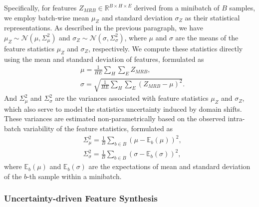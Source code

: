 \documentclass[lettersize,journal]{IEEEtran}
\begin{document}
Specifically, for features $ Z_{MRB} \in \mathbb{R}^{B \times H \times E} $ derived from a minibatch of $ B $ samples, we employ batch-wise mean $ \mu_{Z} $ and standard deviation $ \sigma_{Z} $ as their statistical representations.
As described in the previous paragraph, we have $ \mu_{Z} \sim \mathcal{N}(\mu, \Sigma_{\mu}^{2}) $ and $ \sigma_{Z} \sim \mathcal{N}(\sigma, \Sigma_{\sigma}^{2}) $, where $ \mu $ and $ \sigma $ are the means of the feature statistics $ \mu_{Z} $ and $ \sigma_{Z} $, respectively.
We compute these statistics directly using the mean and standard deviation of features, formulated as
\begin{align}
    & \mu=\frac{1}{HE}\sum_{H}\sum_{E}Z_{MRB}, \\
    & \sigma = \sqrt{\frac{1}{HE}\sum_{H}\sum_{E}(Z_{MRB} - \mu)^{2}}.
\end{align}
And $ \Sigma_{\mu}^{2} $ and $ \Sigma_{\sigma}^{2} $ are the variances associated with feature statistics $\mu_{Z}$ and $\sigma_{Z}$, which also serve to model the statistics uncertainty induced by domain shifts.
These variances are estimated non-parametrically based on the observed intra-batch variability of the feature statistics, formulated as
\begin{align}
    & \Sigma_{\mu}^{2}=\frac{1}{B}\sum_{b\in B}(\mu-\mathbb{E}_{b}(\mu))^{2}, \\
    & \Sigma_{\sigma}^{2} = \frac{1}{B}\sum_{b\in B}(\sigma-\mathbb{E}_{b}(\sigma))^{2},
\end{align}
where $ \mathbb{E}_{b}(\mu) $ and $ \mathbb{E}_{b}(\sigma) $ are the expectations of mean and standard deviation of the $ b $-th sample within a minibatch.

\subsubsection{Uncertainty-driven Feature Synthesis}
\end{document}
